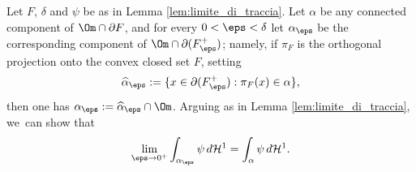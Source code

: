 \begin{remark} \label{rem:limite_di_traccia} Let $F$, $\delta$ and $\psi$ be as in Lemma \ref{lem:limite_di_traccia}.
Let $\alpha$ be any connected component of $\Om\cap\partial F$, and for every $0<\eps<\delta$ let $\alpha_\eps$ be the corresponding component of $\Om\cap\partial (F^+_\eps)$; namely, if $\pi_F$ is the orthogonal projection onto the convex closed set $F$, setting
\[
\widehat\alpha_\eps:=\{x\in \partial (F^+_\eps):\pi_F(x)\in \alpha\},
\]
then one has $\alpha_\eps:=\widehat\alpha_\eps\cap \Om$.
Arguing as in Lemma \ref{lem:limite_di_traccia}, we~can show that
\begin{equation*}
\lim_{\eps\to0^+}
\int_{\alpha_\eps}\psi\,d\mathcal{H}^1=\int_{\alpha}\psi\,d\mathcal{H}^1.
\end{equation*}
\end{remark}

